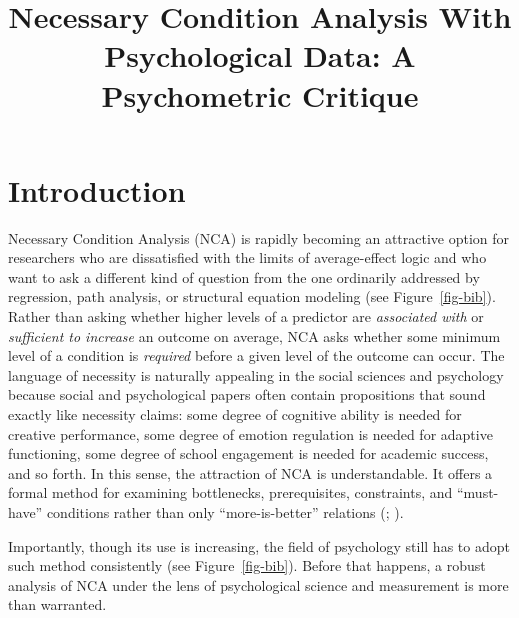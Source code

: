 \documentclass[
  man,
  longtable,
  nolmodern,
  notxfonts,
  notimes,
  colorlinks=true,linkcolor=blue,citecolor=blue,urlcolor=blue]{apa7}
\title{Necessary Condition Analysis With Psychological Data: A
Psychometric Critique}
\affiliation{
{Department of General Psychology, University of Padua}}
\newlength{\cslhangindent}
\begin{document}
\maketitle




\setlength\LTleft{0pt}



\ifdefined\Shaded\renewenvironment{Shaded}{\begin{snugshade}\begin{singlespace}}{\end{singlespace}\end{snugshade}}\fi

\setlength{\cslhangindent}{0.5in}

\section{Introduction}\label{introduction}

Necessary Condition Analysis (NCA) is rapidly becoming an attractive
option for researchers who are dissatisfied with the limits of
average-effect logic and who want to ask a different kind of question
from the one ordinarily addressed by regression, path analysis, or
structural equation modeling (see Figure~\ref{fig-bib}). Rather than
asking whether higher levels of a predictor are \emph{associated with}
or \emph{sufficient to increase} an outcome on average, NCA asks whether
some minimum level of a condition is \emph{required} before a given
level of the outcome can occur. The language of necessity is naturally
appealing in the social sciences and psychology because social and
psychological papers often contain propositions that sound exactly like
necessity claims: some degree of cognitive ability is needed for
creative performance, some degree of emotion regulation is needed for
adaptive functioning, some degree of school engagement is needed for
academic success, and so forth. In this sense, the attraction of NCA is
understandable. It offers a formal method for examining bottlenecks,
prerequisites, constraints, and ``must-have'' conditions rather than
only ``more-is-better'' relations
(;
).

Importantly, though its use is increasing, the field of psychology still
has to adopt such method consistently (see Figure~\ref{fig-bib}). Before
that happens, a robust analysis of NCA under the lens of psychological
science and measurement is more than warranted.
\end{document}
